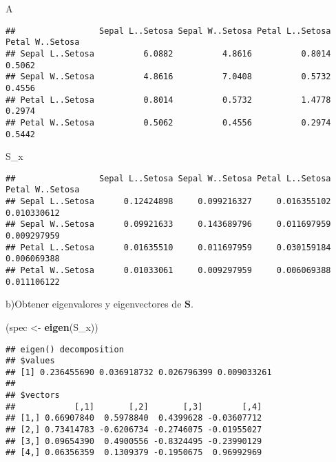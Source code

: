 \documentclass[
]{article}
\newenvironment{Shaded}{\begin{snugshade}}{\end{snugshade}}
\newcommand{\KeywordTok}[1]{\textcolor[rgb]{0.13,0.29,0.53}{\textbf{#1}}}
\newcommand{\NormalTok}[1]{#1}
\newcommand{\StringTok}[1]{\textcolor[rgb]{0.31,0.60,0.02}{#1}}
\begin{document}
\begin{Shaded}
\begin{Highlighting}[]
\NormalTok{A}
\end{Highlighting}
\end{Shaded}

\begin{verbatim}
##                 Sepal L..Setosa Sepal W..Setosa Petal L..Setosa Petal W..Setosa
## Sepal L..Setosa          6.0882          4.8616          0.8014          0.5062
## Sepal W..Setosa          4.8616          7.0408          0.5732          0.4556
## Petal L..Setosa          0.8014          0.5732          1.4778          0.2974
## Petal W..Setosa          0.5062          0.4556          0.2974          0.5442
\end{verbatim}

\begin{Shaded}
\begin{Highlighting}[]
\NormalTok{S_x}
\end{Highlighting}
\end{Shaded}

\begin{verbatim}
##                 Sepal L..Setosa Sepal W..Setosa Petal L..Setosa Petal W..Setosa
## Sepal L..Setosa      0.12424898     0.099216327     0.016355102     0.010330612
## Sepal W..Setosa      0.09921633     0.143689796     0.011697959     0.009297959
## Petal L..Setosa      0.01635510     0.011697959     0.030159184     0.006069388
## Petal W..Setosa      0.01033061     0.009297959     0.006069388     0.011106122
\end{verbatim}

b)Obtener eigenvalores y eigenvectores de \(\boldsymbol{S}\).

\begin{Shaded}
\begin{Highlighting}[]
\NormalTok{(spec <-}\StringTok{ }\KeywordTok{eigen}\NormalTok{(S_x))}
\end{Highlighting}
\end{Shaded}

\begin{verbatim}
## eigen() decomposition
## $values
## [1] 0.236455690 0.036918732 0.026796399 0.009033261
## 
## $vectors
##            [,1]       [,2]       [,3]        [,4]
## [1,] 0.66907840  0.5978840  0.4399628 -0.03607712
## [2,] 0.73414783 -0.6206734 -0.2746075 -0.01955027
## [3,] 0.09654390  0.4900556 -0.8324495 -0.23990129
## [4,] 0.06356359  0.1309379 -0.1950675  0.96992969
\end{verbatim}
\end{document}
